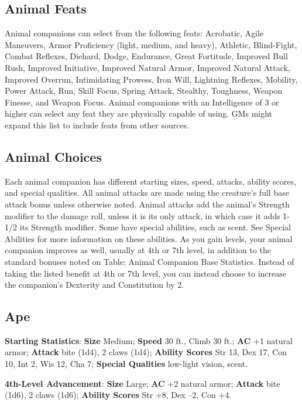 \subsection{Animal Feats}

				
Animal companions can select from the following feats: Acrobatic, Agile Maneuvers, Armor Proficiency (light, medium, and heavy), Athletic, Blind-Fight, Combat Reflexes, Diehard, Dodge, Endurance, Great Fortitude, Improved Bull Rush, Improved Initiative, Improved Natural Armor, Improved Natural Attack, Improved Overrun, Intimidating Prowess, Iron Will, Lightning Reflexes, Mobility, Power Attack, Run, Skill Focus, Spring Attack, Stealthy, Toughness, Weapon Finesse, and Weapon Focus. Animal companions with an Intelligence of 3 or higher can select any feat they are physically capable of using. GMs might expand this list to include feats from other sources. 
				
\subsection{Animal Choices}

				
Each animal companion has different starting sizes, speed, attacks, ability scores, and special qualities. All animal attacks are made using the creature's full base attack bonus unless otherwise noted. Animal attacks add the animal's Strength modifier to the damage roll, unless it is its only attack, in which case it adds 1-1/2 its Strength modifier. Some have special abilities, such as scent. See Special Abilities for more information on these abilities. As you gain levels, your animal companion improves as well, usually at 4th or 7th level, in addition to the standard bonuses noted on Table: Animal Companion Base Statistics. Instead of taking the listed benefit at 4th or 7th level, you can instead choose to increase the companion's Dexterity and Constitution by 2.
				
\subsection{Ape}

				
\textbf{Starting Statistics}:\textbf{ Size} Medium; \textbf{Speed} 30 ft., Climb 30 ft.; \textbf{AC} +1 natural armor; \textbf{Attack} bite (1d4), 2 claws (1d4); \textbf{Ability Scores }Str 13, Dex 17, Con 10, Int 2, Wis 12, Cha 7; \textbf{Special Qualities} low-light vision, scent.
				
\textbf{4th-Level Advancement}: \textbf{Size }Large; \textbf{AC }+2 natural armor; \textbf{Attack} bite (1d6), 2 claws (1d6); \textbf{Ability Scores }Str +8, Dex --2, Con +4.
				
